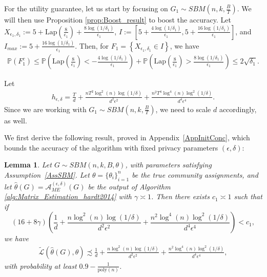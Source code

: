 \documentclass{article}
\newtheorem{lemma}{Lemma}
\newcommand{\thetahat}{\ensuremath{\widehat{\theta}}}
\begin{document}
For the utility guarantee, let us start by focusing on $G_1 \sim SBM\left(n, k, \frac{B}{T}\right)$. We will then use Proposition \ref{prop:Boost_result} to boost the accuracy. Let $X_{\epsilon_1, \delta_1} := 5 + \mathrm{Lap}\left(\frac{8}{\epsilon_1}\right) + \frac{8\log(1/\delta_1)}{\epsilon_1}$, $I := \left[5 + \frac{4\log(1/\delta_1)}{\epsilon_1}, 5 + \frac{16\log(1/\delta_1)}{\epsilon_1}\right]$, and $I_{max} := 5 + \frac{16\log(1/\delta_1)}{\epsilon_1}$. Then, for $F_1 = \left\{X_{\epsilon_1, \delta_1} \in I\right\}$, we have
\begin{align*}
 \mathbb{P}\left(F_1^c\right) \leq \mathbb{P}\left(\mathrm{Lap}\left(\frac{8}{\epsilon_1}\right) < -\frac{4\log(1/\delta_1)}{\epsilon_1}\right) + \mathbb{P}\left(\mathrm{Lap}\left(\frac{8}{\epsilon_1}\right) > \frac{8\log(1/\delta_1)}{\epsilon_1}\right) \leq 2\sqrt{\delta_1}.
\end{align*}

Let
\begin{align*}
h_{\epsilon, \delta} = \frac{T}{d} + \frac{nT^2\log^2(n)\log(1/\delta)}{d^2\epsilon^2} + \frac{n^2T^4\log^4(n)\log^2(1/\delta)}{d^4\epsilon^4}.
\end{align*}
Since we are working with $G_1 \sim SBM\left(n, k, \frac{B}{T}\right)$, we need to scale $d$ accordingly, as well.

We first derive the following result, proved in Appendix~\ref{AppInitConc}, which bounds the accuracy of the algorithm with fixed privacy parameters $(\epsilon, \delta)$:

\begin{lemma}
\label{lemma:Initial_Conc_bd_matrix_estim}
Let $G \sim SBM(n, k, B, \theta)$, with parameters satisfying Assumption~\ref{AssSBM}. Let $\theta = \{\theta_i\}_{i = 1}^n$ be the true community assignments, and let
$\thetahat(G) = \mathcal{A}_{ME}^{(\epsilon, \delta)}(G)$ be the output of Algorithm \ref{alg:Matrix_Estimation_hardt2014} with $\gamma \asymp 1$. Then there exists $c_1 \asymp 1$ such that if
\begin{equation*}
(16 + 8\gamma)\left(\frac{1}{d} + \frac{n\log^2(n)\log(1/\delta)}{d^2\epsilon^2} + \frac{n^2\log^4(n)\log^2(1/\delta)}{d^4\epsilon^4}\right) < c_1,
\end{equation*}
we have
\begin{align*}
\widetilde{\mathcal{L}}\left(\thetahat(G), \theta\right) \precsim \frac{1}{d} + \frac{n\log^2(n)\log(1/\delta)}{d^2\epsilon^2} + \frac{n^2\log^4(n)\log^2(1/\delta)}{d^4\epsilon^4},
\end{align*}
with probability at least $0.9 - \frac{1}{\mathrm{poly}(n)}$.
\end{lemma}
\end{document}
